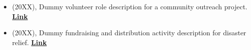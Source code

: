 \begin{itemize}[itemsep=-3pt, left=0pt]
    
    \item (20XX), Dummy volunteer role description for a community outreach project. \textbf{{\href{https://www.example.com/volunteer}{Link}}}
    \item (20XX), Dummy fundraising and distribution activity description for disaster relief. \textbf{{\href{https://www.example.com/volunteer}{Link}}}
    
\end{itemize}
\vspace{-12pt}

